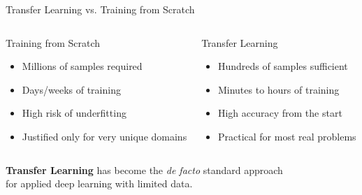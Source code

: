 \documentclass[aspectratio=169,xcolor=dvipsnames]{beamer}
\begin{document}
\begin{frame}{Transfer Learning vs. Training from Scratch}
    \begin{columns}
        \begin{alertblock}{Training from Scratch}
            \begin{itemize}
                \item Millions of samples required
                \item Days/weeks of training
                \item High risk of underfitting
                \item Justified only for very unique domains
            \end{itemize}
        \end{alertblock}
        \begin{block}{Transfer Learning}
            \begin{itemize}
                \item Hundreds of samples sufficient
                \item Minutes to hours of training
                \item High accuracy from the start
                \item Practical for most real problems
            \end{itemize}
        \end{block}
    \end{columns}
    \vspace{0.4cm}
    \begin{center}
        \textbf{Transfer Learning} has become the \textit{de facto} standard approach \\
        for applied deep learning with limited data.
    \end{center}
\end{frame}
\end{document}
